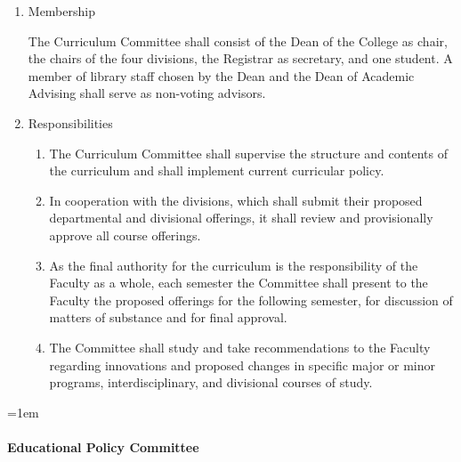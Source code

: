 \documentclass{manual}
\let\oldparagraph\paragraph
\renewcommand\paragraph{\leftskip=1em\oldparagraph}
\newcommand{\itemLevelA}{\alph*.}
\newcommand{\itemLevelB}{\arabic*)}
\newcommand{\itemRefA}{\alph*}
\newcommand{\itemRefB}{\arabic*}
\begin{document}
				\begin{enumerate}[label=\itemLevelA,ref=\itemRefA]
				\item Membership

					The Curriculum Committee shall consist of the Dean of the College as chair, the chairs of the four divisions, the Registrar as secretary, and one student. A member of library staff chosen by the Dean and the Dean of Academic Advising shall serve as non-voting advisors.

				\item Responsibilities

					\begin{enumerate}[label=\itemLevelB,ref=\itemRefB]
					\item The Curriculum Committee shall supervise the structure and contents of the curriculum and shall implement current curricular policy.
					\item In cooperation with the divisions, which shall submit their proposed departmental and divisional offerings, it shall review and provisionally approve all course offerings.
					\item As the final authority for the curriculum is the responsibility of the Faculty as a whole, each semester the Committee shall present to the Faculty the proposed offerings for the following semester, for discussion of matters of substance and for final approval.
					\item The Committee shall study and take recommendations to the Faculty regarding innovations and proposed changes in specific major or minor programs, interdisciplinary, and divisional courses of study.
					\end{enumerate}
				
				\end{enumerate}

			\paragraph{Educational Policy Committee}
\end{document}
